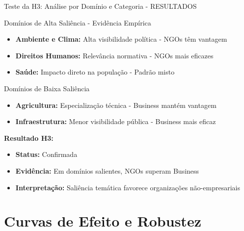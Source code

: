 \documentclass[aspectratio=169]{beamer}
\begin{document}
\begin{frame}{Teste da H3: Análise por Domínio e Categoria - RESULTADOS}
\begin{block}{Domínios de Alta Saliência - Evidência Empírica}
\begin{itemize}
\item \textbf{Ambiente e Clima:} Alta visibilidade política - NGOs têm vantagem
\item \textbf{Direitos Humanos:} Relevância normativa - NGOs mais eficazes
\item \textbf{Saúde:} Impacto direto na população - Padrão misto
\end{itemize}
\end{block}

\begin{block}{Domínios de Baixa Saliência}
\begin{itemize}
\item \textbf{Agricultura:} Especialização técnica - Business mantém vantagem
\item \textbf{Infraestrutura:} Menor visibilidade pública - Business mais eficaz
\end{itemize}
\end{block}

\textbf{Resultado H3:} 
\begin{itemize}
\item \textbf{Status:} Confirmada
\item \textbf{Evidência:} Em domínios salientes, NGOs superam Business
\item \textbf{Interpretação:} Saliência temática favorece organizações não-empresariais
\end{itemize}
\end{frame}


\section{Curvas de Efeito e Robustez}
\end{document}
